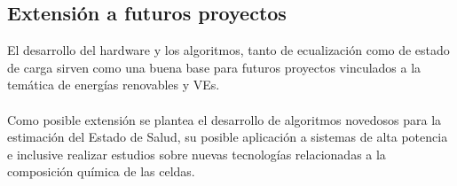 \documentclass[10pt,a4paper]{article}
\begin{document}
\subsection{Extensión a futuros proyectos}

El desarrollo del hardware y los algoritmos, tanto de ecualización como de estado de carga sirven como una buena base para futuros proyectos vinculados a la temática de energías renovables y VEs.\\
\\
Como posible extensión se plantea el desarrollo de algoritmos novedosos para la estimación del Estado de Salud, su posible aplicación a sistemas de alta potencia e inclusive realizar estudios sobre nuevas tecnologías relacionadas a la composición química de las celdas.
\end{document}
